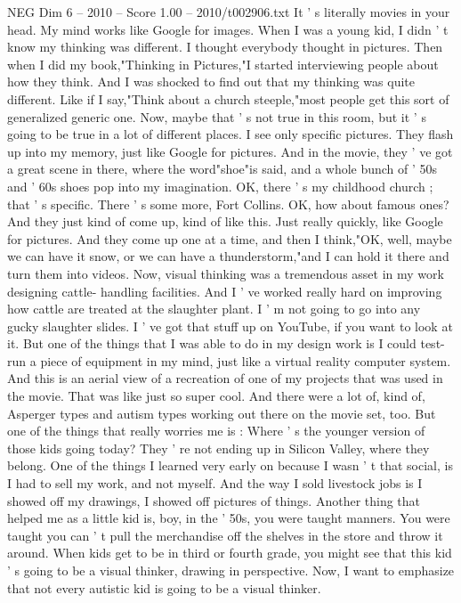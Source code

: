 \begin{textsample}{NEG Dim 6 – 2010 – Score 1.00 – 2010/t002906.txt}
It ' s literally movies in your head.
My mind works like Google for images.
When I was a young kid, I didn ' t know my thinking was different.
I thought everybody thought in pictures.
Then when I did my book,"Thinking in Pictures,"I started interviewing people about how they think.
And I was shocked to find out that my thinking was quite different.
Like if I say,"Think about a church steeple,"most people get this sort of generalized generic one.
Now, maybe that ' s not true in this room, but it ' s going to be true in a lot of different places.
I see only specific pictures.
They flash up into my memory, just like Google for pictures.
And in the movie, they ' ve got a great scene in there, where the word"shoe"is said, and a whole bunch of ' 50s and ' 60s shoes pop into my imagination.
OK, there ' s my childhood church ; that ' s specific.
There ' s some more, Fort Collins.
OK, how about famous ones?
And they just kind of come up, kind of like this.
Just really quickly, like Google for pictures.
And they come up one at a time, and then I think,"OK, well, maybe we can have it snow, or we can have a thunderstorm,"and I can hold it there and turn them into videos.
Now, visual thinking was a tremendous asset in my work designing cattle- handling facilities.
And I ' ve worked really hard on improving how cattle are treated at the slaughter plant.
I ' m not going to go into any gucky slaughter slides.
I ' ve got that stuff up on YouTube, if you want to look at it.
But one of the things that I was able to do in my design work is I could test- run a piece of equipment in my mind, just like a virtual reality computer system.
And this is an aerial view of a recreation of one of my projects that was used in the movie.
That was like just so super cool.
And there were a lot of, kind of, Asperger types and autism types working out there on the movie set, too.
But one of the things that really worries me is : Where ' s the younger version of those kids going today?
They ' re not ending up in Silicon Valley, where they belong.
One of the things I learned very early on because I wasn ' t that social, is I had to sell my work, and not myself.
And the way I sold livestock jobs is I showed off my drawings, I showed off pictures of things.
Another thing that helped me as a little kid is, boy, in the ' 50s, you were taught manners.
You were taught you can ' t pull the merchandise off the shelves in the store and throw it around.
When kids get to be in third or fourth grade, you might see that this kid ' s going to be a visual thinker, drawing in perspective.
Now, I want to emphasize that not every autistic kid is going to be a visual thinker.

\end{textsample}
